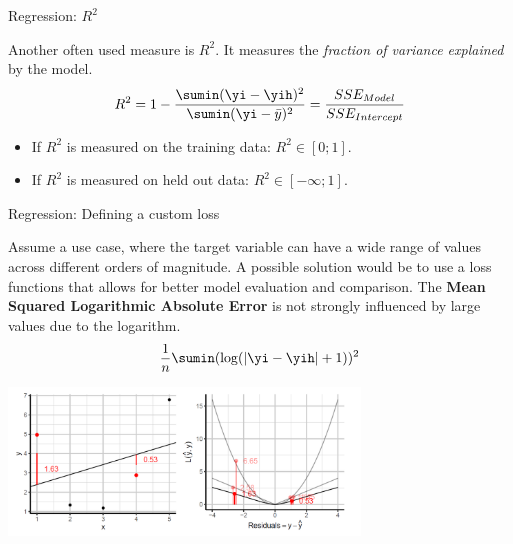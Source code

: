 \begin{frame}{Regression: \(R^2\)}

Another often used measure is \(R^2\). It measures the \emph{fraction of
variance explained} by the model. \[
R^2 = 1 - \frac{\sumin (\yi - \yih)^2}{\sumin (\yi - \bar{y})^2} = \frac{SSE_{Model}}{SSE_{Intercept}}
\]

\begin{itemize}
\item
  If \(R^2\) is measured on the training data: \(R^2 \in [0;1]\).
\item
  If \(R^2\) is measured on held out data: \(R^2 \in [-\infty;1]\).
\end{itemize}

\end{frame}

\begin{frame}{Regression: Defining a custom loss}

Assume a use case, where the target variable can have a wide range of
values across different orders of magnitude. A possible solution would
be to use a loss functions that allows for better model evaluation and
comparison. The \textbf{Mean Squared Logarithmic Absolute Error} is not
strongly influenced by large values due to the logarithm. \[
\frac{1}{n} \sumin (\log(|\yi - \yih| + 1))^2
\]

\scriptsize
\begin{center}
\includegraphics[width=0.7\textwidth]{plots/custom-loss.png}
\end{center}

\normalsize 

\end{frame}

